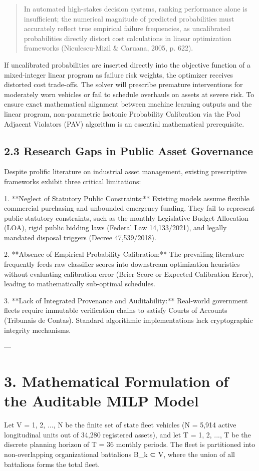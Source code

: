 \documentclass[10pt,a4paper,journal]{article}
\begin{document}
\begin{quote}
\small In automated high-stakes decision systems, ranking performance alone is insufficient; the numerical magnitude of predicted probabilities must accurately reflect true empirical failure frequencies, as uncalibrated probabilities directly distort cost calculations in linear optimization frameworks (Niculescu-Mizil \& Caruana, 2005, p. 622).
\end{quote}
If uncalibrated probabilities are inserted directly into the objective function of a mixed-integer linear program as failure risk weights, the optimizer receives distorted cost trade-offs. The solver will prescribe premature interventions for moderately worn vehicles or fail to schedule overhauls on assets at severe risk. To ensure exact mathematical alignment between machine learning outputs and the linear program, non-parametric Isotonic Probability Calibration via the Pool Adjacent Violators (PAV) algorithm is an essential mathematical prerequisite.

\subsection{2.3 Research Gaps in Public Asset Governance}
Despite prolific literature on industrial asset management, existing prescriptive frameworks exhibit three critical limitations:

1. **Neglect of Statutory Public Constraints:** Existing models assume flexible commercial purchasing and unbounded emergency funding. They fail to represent public statutory constraints, such as the monthly Legislative Budget Allocation (LOA), rigid public bidding laws (Federal Law 14,133/2021), and legally mandated disposal triggers (Decree 47,539/2018).

2. **Absence of Empirical Probability Calibration:** The prevailing literature frequently feeds raw classifier scores into downstream optimization heuristics without evaluating calibration error (Brier Score or Expected Calibration Error), leading to mathematically sub-optimal schedules.

3. **Lack of Integrated Provenance and Auditability:** Real-world government fleets require immutable verification chains to satisfy Courts of Accounts (Tribunais de Contas). Standard algorithmic implementations lack cryptographic integrity mechanisms.

---

\section{3. Mathematical Formulation of the Auditable MILP Model}
Let V = {1, 2, ..., N} be the finite set of state fleet vehicles (N = 5,914 active longitudinal units out of 34,280 registered assets), and let T = {1, 2, ..., T} be the discrete planning horizon of T = 36 monthly periods. The fleet is partitioned into non-overlapping organizational battalions B\_k ⊂ V, where the union of all battalions forms the total fleet.
\end{document}
